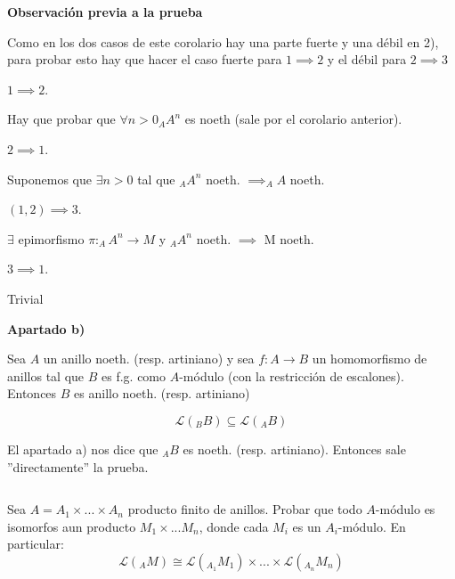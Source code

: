 \documentclass[openany]{book}
\begin{document}
\begin{flushright}
    \textbf{Observación previa a la prueba}
\end{flushright}

Como en los dos casos de este corolario hay una parte fuerte y una débil en 2), para probar esto hay que hacer el caso fuerte para $ 1\implies 2$ y el débil para $ 2\implies 3$

\begin{demonstration}
    \noindent $ 1\implies 2$.

    Hay que probar que $ \forall n > 0 _{A}A^{n}$ es noeth (sale por el corolario anterior).

    \noindent $ 2 \implies 1$.

    Suponemos que $ \exists n>0 $ tal que $ _{A}A^{n}$ noeth. $ \implies _{A}A$ noeth.

    \noindent $ (1,2) \implies 3$.

    $ \exists $ epimorfismo $ \pi: _{A}A^{n} \to M$ y $ _{A}A^{n}$ noeth. $ \implies$ M noeth.

    \noindent $ 3\implies 1$.

    Trivial
\end{demonstration}

\setcounter{propositiont}{27}
\newpage
\begin{corollary}
    \textbf{Apartado b)}

    Sea $ A$ un anillo noeth. (resp. artiniano) y sea $ f: A \to B$ un homomorfismo de anillos tal que $ B$ es f.g. como $ A$-módulo (con la restricción de escalones). Entonces $ B$ es anillo noeth. (resp. artiniano)
\end{corollary}

\begin{demonstration}
    $$ \mathcal{L}(_{B}B) \subseteq \mathcal{L}(_{A}B) $$

    El apartado a) nos dice que $ _{A}B$ es noeth. (resp. artiniano). Entonces sale ''directamente'' la prueba.
\end{demonstration}

\begin{exercise}
    $ $

    Sea $ A = A_1 \times ... \times A_n$ producto finito de anillos. Probar que todo $ A$-módulo es isomorfos aun producto $ M_1\times... M_n$, donde cada $ M_i$ es un $ A_i$-módulo. En particular:
    $$ \mathcal{L}(_{A}M) \cong \mathcal{L}(_{A_1}M_1) \times ... \times\mathcal{L}(_{A_n}M_n) $$
\end{exercise}
\end{document}
